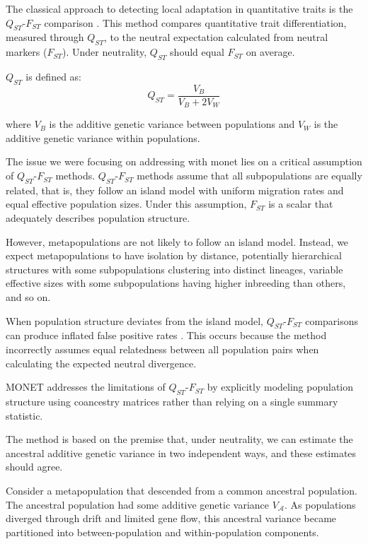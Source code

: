 \documentclass[11pt]{article}
\begin{document}
The classical approach to detecting local adaptation in quantitative traits is the $Q_{ST}$-$F_{ST}$ comparison \citep{spitze1993population}. This method compares quantitative trait differentiation, measured through $Q_{ST}$, to the neutral expectation calculated from neutral markers ($F_{ST}$). Under neutrality, $Q_{ST}$ should equal $F_{ST}$ on average.

$Q_{ST}$ is defined as:
$$Q_{ST} = \frac{V_B}{V_B + 2V_W}$$

where $V_B$ is the additive genetic variance between populations and $V_W$ is the additive genetic variance within populations.

The issue we were focusing on addressing with monet lies on a critical assumption of  $Q_{ST}$-$F_{ST}$ methods. $Q_{ST}$-$F_{ST}$ methods assume that all subpopulations are equally related, that is, they follow an island model with uniform migration rates and equal effective population sizes. Under this assumption, $F_{ST}$ is a scalar that adequately describes population structure.

However, metapopulations are not likely to follow an island model. Instead, we expect metapopulations to have isolation by distance, potentially hierarchical structures with some subpopulations clustering into distinct lineages, variable effective sizes with some subpopulations having higher inbreeding than others, and so on.

When population structure deviates from the island model, $Q_{ST}$-$F_{ST}$ comparisons can produce inflated false positive rates \citep{de2022common,do2025method}. This occurs because the method incorrectly assumes equal relatedness between all population pairs when calculating the expected neutral divergence.

MONET addresses the limitations of $Q_{ST}$-$F_{ST}$ by explicitly modeling population structure using coancestry matrices rather than relying on a single summary statistic.

The method is based on the premise that, under neutrality, we can estimate the ancestral additive genetic variance in two independent ways, and these estimates should agree.

Consider a metapopulation that descended from a common ancestral population. The ancestral population had some additive genetic variance $V_\mathcal{A}$. As populations diverged through drift and limited gene flow, this ancestral variance became partitioned into between-population and within-population components.
\end{document}

